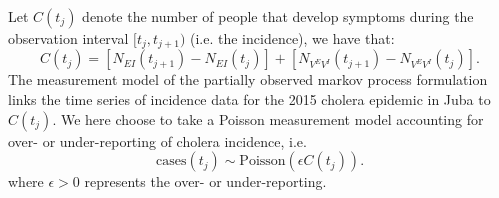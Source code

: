Let \(C(t_j)\) denote the number of people that develop symptoms during the
observation interval \([t_j, t_{j+1})\) (i.e. the incidence), we have
that:
\begin{equation}
    C(t_j) = [N_{EI}(t_{j+1}) - N_{EI}(t_j)] + [N_{V^EV^I}(t_{j+1}) - N_{V^EV^I}(t_j)]. \label{eq:stochrep}
\end{equation}
The measurement model of the partially observed markov process formulation links the time series of incidence data for the 2015 cholera epidemic in Juba to \(C(t_j)\). We here choose to take a Poisson measurement model accounting for over- or under-reporting of cholera incidence, i.e.
\[
	\text{cases}(t_j) \sim \text{Poisson}(\epsilon C(t_j)).
\]
where \(\epsilon > 0\) represents the over- or under-reporting.

%
